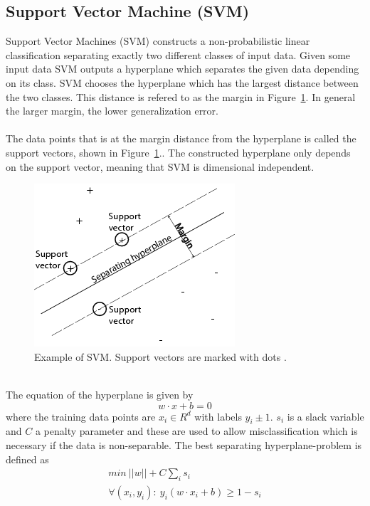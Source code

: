 \subsection{Support Vector Machine (SVM)}
Support Vector Machines (SVM) constructs a non-probabilistic linear classification separating exactly two different classes of input data. Given some input data SVM outputs a hyperplane which separates the given data depending on its class. SVM chooses the hyperplane which has the largest distance between the two classes. This distance is refered to as the margin in Figure~\ref{fig:svm}. In general the larger margin, the lower generalization error. \citep{svm_ai} \\\\
The data points that is at the margin distance from the hyperplane is called the support vectors, shown in Figure~\ref{fig:svm}.. The constructed hyperplane only depends on the support vector, meaning that SVM is dimensional independent.
\begin{figure}[h!]
\centering
\includegraphics[scale = 0.7]{../Plottar/svmhyperplane.png}
\caption{Example of SVM. Support vectors are marked with dots \citep{svm_picture}. }
\label{fig:svm}
\end{figure} \\
The equation of the hyperplane is given by
\begin{equation}
w \cdot x + b = 0
\end{equation}
where the training data points are $x_i \in R^d$ with labels $y_i \pm 1$. $s_i$ is a slack variable and $C$ a penalty parameter and these are used to allow misclassification which is necessary if the data is non-separable. The best separating hyperplane-problem is defined as
\begin{equation}
\begin{array}{l}
min \: ||w|| + C \sum_{i} s_i \\
\forall (x_i, y_i) : \: y_i(w \cdot x_i + b) \geq 1 - s_i
\end{array}
\end{equation}
